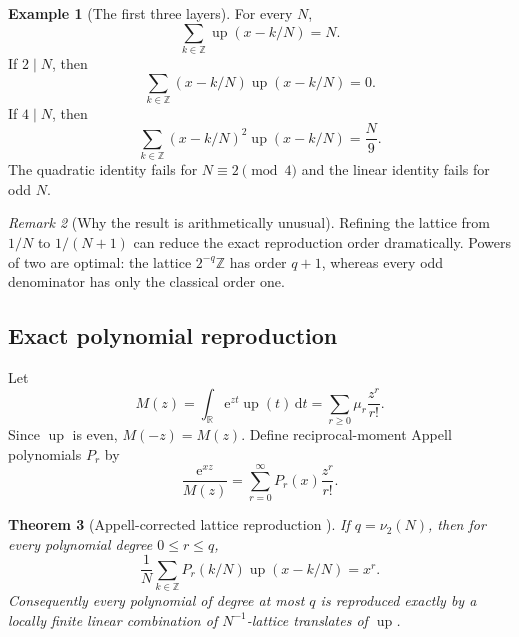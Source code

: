 \documentclass[11pt]{article}
\numberwithin{equation}{section}
\newtheorem{theorem}{Theorem}[section]
\theoremstyle{definition}
\newtheorem{example}[theorem]{Example}
\theoremstyle{remark}
\newtheorem{remark}[theorem]{Remark}
\newcommand{\R}{\mathbb R}
\newcommand{\Z}{\mathbb Z}
\newcommand{\Up}{\operatorname{up}}
\newcommand{\dd}{\,\mathrm d}
\newcommand{\e}{\mathrm e}
\begin{document}
\begin{example}[The first three layers]
For every $N$,
\begin{equation}
 \sum_{k\in\Z}\Up(x-k/N)=N.                               \label{p2:eq:PU}
\end{equation}
If $2\mid N$, then
\begin{equation}
 \sum_{k\in\Z}(x-k/N)\Up(x-k/N)=0.                        \label{p2:eq:first-weight}
\end{equation}
If $4\mid N$, then
\begin{equation}
 \sum_{k\in\Z}(x-k/N)^2\Up(x-k/N)=\frac{N}{9}.           \label{p2:eq:second-weight}
\end{equation}
The quadratic identity fails for $N\equiv2\pmod4$ and the linear identity fails
for odd $N$.
\end{example}

\begin{remark}[Why the result is arithmetically unusual]
Refining the lattice from $1/N$ to $1/(N+1)$ can reduce the exact reproduction
order dramatically.  Powers of two are optimal: the lattice $2^{-q}\Z$ has
order $q+1$, whereas every odd denominator has only the classical order one.
\end{remark}

\subsection{Exact polynomial reproduction}

Let
\begin{equation}
 M(z)=\int_{\R}\e^{zt}\Up(t)\dd t
     =\sum_{r\ge0}\mu_r\frac{z^r}{r!}.                    \label{p2:eq:mgf}
\end{equation}
Since $\Up$ is even, $M(-z)=M(z)$.  Define reciprocal-moment Appell polynomials
$P_r$ by
\begin{equation}
 \frac{\e^{xz}}{M(z)}=\sum_{r=0}^{\infty}P_r(x)\frac{z^r}{r!}.              \label{p2:eq:Pr}
\end{equation}

\begin{theorem}[Appell-corrected lattice reproduction \NewResult]
\label{p2:thm:reproduction}
If $q=\nu_2(N)$, then for every polynomial degree $0\le r\le q$,
\begin{equation}
 \boxed{\frac1N\sum_{k\in\Z}P_r(k/N)\Up(x-k/N)=x^r.}      \label{p2:eq:reproduce}
\end{equation}
Consequently every polynomial of degree at most $q$ is reproduced exactly by a
locally finite linear combination of $N^{-1}$-lattice translates of $\Up$.
\end{theorem}
\end{document}
